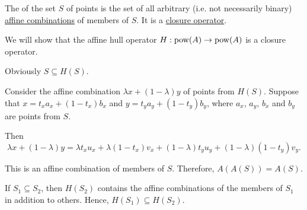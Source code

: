 \begin{definition}\label{def:affine_hull}\mimprovised
  The  of the set \( S \) of points is the set of all arbitrary (i.e. not necessarily binary) \hyperref[rem:affine_combination]{affine combinations} of members of \( S \). It is a \hyperref[def:closure_operator]{closure operator}.
\end{definition}
\begin{defproof}
  We will show that the affine hull operator \( H: \operatorname{pow}(A) \to \operatorname{pow}(A) \) is a closure operator.

   Obviously \( S \subseteq H(S) \).

   Consider the affine combination \( \lambda x + (1 - \lambda) y \) of points from \( H(S) \). Suppose that \( x = t_x a_x + (1 - t_x) b_x \) and \( y = t_y a_y + (1 - t_y) b_y \), where \( a_x \), \( a_y \), \( b_x \) and \( b_y \) are points from \( S \).

  Then
  \begin{equation*}
    \lambda x + (1 - \lambda) y
    =
    \lambda t_x u_x + \lambda (1 - t_x) v_x + (1 - \lambda) t_y u_y + (1 - \lambda) (1 - t_y) v_y.
  \end{equation*}

  This is an affine combination of members of \( S \). Therefore, \( A(A(S)) = A(S) \).

   If \( S_1 \subseteq S_2 \), then \( H(S_2) \) contains the affine combinations of the members of \( S_1 \) in addition to others. Hence, \( H(S_1) \subseteq H(S_2) \).
\end{defproof}

